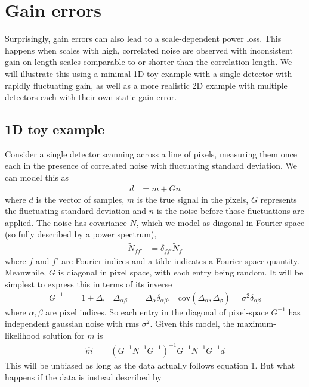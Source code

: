 \documentclass[twocolumn,apj]{aastex63}
\begin{document}
\section{Gain errors}
Surprisingly, gain errors can also lead to a scale-dependent power loss.
This happens when scales with high, correlated noise are observed with
inconsistent gain on length-scales comparable to or shorter than the
correlation length. We will illustrate this using a minimal 1D toy example
with a single detector with rapidly fluctuating gain, as well as a more
realistic 2D example with multiple detectors each with their own static
gain error.

\subsection{1D toy example}
Consider a single detector scanning across a line of pixels, measuring them
once each in the presence of correlated noise with fluctuating standard deviation.
We can model this as
\begin{align}
d &= m + G n \tag{1}
\end{align}
where $d$ is the vector of samples, $m$ is the true signal in the pixels,
$G$ represents the fluctuating standard deviation and $n$ is the noise
before those fluctuations are applied. The noise has covariance $N$,
which we model as diagonal in Fourier space (so fully described by
a power spectrum),
\begin{align}
\widetilde{N}_{ff'} &= \delta_{ff'} \widetilde{N}_f
\end{align}
where $f$ and $f'$ are Fourier indices and a tilde indicates a Fourier-space quantity.
Meanwhile, $G$ is diagonal in pixel space, with
each entry being random. It will be simplest to express this in terms
of its inverse
\begin{align}
G^{-1} &= 1 + \Delta, & \Delta_{\alpha\beta} &= \Delta_\alpha \delta_{\alpha\beta}, & \text{cov}(\Delta_\alpha,\Delta_\beta) = \sigma^2 \delta_{\alpha\beta}
\end{align}
where $\alpha, \beta$ are pixel indices.
So each entry in the diagonal of pixel-space $G^{-1}$ has independent gaussian noise with rms $\sigma^2$.
Given this model, the maximum-likelihood solution for $m$ is
\begin{align}
\hat m &= (G^{-1}N^{-1}G^{-1})^{-1}G^{-1}N^{-1}G^{-1}d \tag{2}
\end{align}
This will be unbiased as long as the data actually follows equation 1. But what happens if the
data is instead described by
\end{document}
